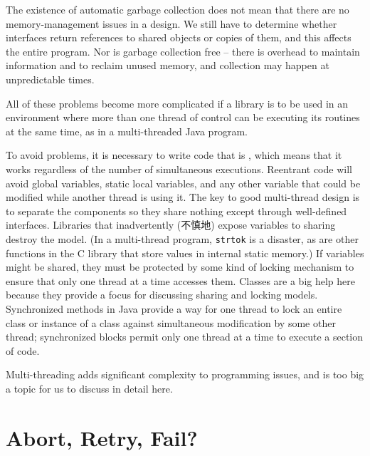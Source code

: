 The existence of automatic garbage collection does not mean that there are
no memory-management issues in a design. We still have to determine whether
interfaces return references to shared objects or copies of them, and this
affects the entire program. Nor is garbage collection free -- there is
overhead to maintain information and to reclaim unused memory, and
collection may happen at unpredictable times.

All of these problems become more complicated if a library is to be used in
an environment where more than one thread of control can be executing its
routines at the same time, as in a multi-threaded Java program.

To avoid problems, it is necessary to write code that is ,
which means that it works regardless of the number of simultaneous
executions.  Reentrant code will avoid global variables, static local
variables, and any other variable that could be modified while another
thread is using it. The key to good multi-thread design is to separate the
components so they share nothing except through well-defined interfaces.
Libraries that inadvertently (不慎地) expose variables to sharing destroy
the model.  (In a multi-thread program, \verb'strtok' is a disaster, as are
other functions in the C library that store values in internal static
memory.) If variables might be shared, they must be protected by some kind
of locking mechanism to ensure that only one thread at a time accesses
them. Classes are a big help here because they provide a focus for
discussing sharing and locking models. Synchronized methods in Java provide
a way for one thread to lock an entire class or instance of a class against
simultaneous modification by some other thread; synchronized blocks permit
only one thread at a time to execute a section of code.

Multi-threading adds significant complexity to programming issues, and is
too big a topic for us to discuss in detail here.

\section{Abort, Retry, Fail?}
\label{sec:abort_retry_fail}

